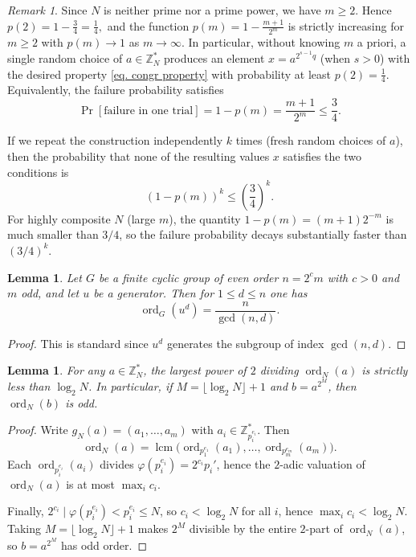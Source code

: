 \documentclass[11pt,reqno]{article}
\numberwithin{equation}{section}
\theoremstyle{plain}
\newtheorem{lemma}[theorem]{Lemma}
\theoremstyle{definition}
\theoremstyle{remark}
\newtheorem{remark}[theorem]{Remark}
\newcommand{\Z}{\mathbb{Z}}
\begin{document}
\begin{remark}\label{rem:nt:amplification}
Since $N$ is neither prime nor a prime power, we have $m\ge 2$.
Hence $p(2)=1-\frac{3}{4}=\frac14,$
and the function $p(m)=1-\frac{m+1}{2^m}$ is strictly increasing for $m\ge 2$ with
$p(m)\to 1$ as $m\to\infty$.
In particular, without knowing $m$ a priori, a single random choice of $a\in\Z_N^\ast$
produces an element $x=a^{2^{s-1}q}$ (when $s>0$) with the desired property \eqref{eq. congr property}
with probability at least $p(2)=\frac14$.
Equivalently, the failure probability satisfies
\[
\Pr[\text{failure in one trial}]=1-p(m)=\frac{m+1}{2^m}\le \frac34.
\]

If we repeat the construction independently $k$ times (fresh random choices of $a$),
then the probability that none of the resulting values $x$ satisfies the two conditions is
\[
(1-p(m))^k \le \left(\frac34\right)^k.
\]
For highly composite $N$ (large $m$), the quantity $1-p(m)=(m+1)2^{-m}$ is much smaller than $3/4$,
so the failure probability decays substantially faster than $(3/4)^k$.
\end{remark}


\medskip
\begin{lemma}\label{lem:nt:cyclic-order}
Let $G$ be a finite cyclic group of even order $n=2^c m$ with $c>0$ and $m$ odd, and let $u$ be a generator.
Then for $1\le d\le n$ one has
\[
\operatorname{ord}_G(u^d)=\frac{n}{\gcd(n,d)}.
\]
\end{lemma}

\begin{proof}
This is standard since $u^d$ generates the subgroup of index $\gcd(n,d)$.
\end{proof}

\medskip
\begin{lemma}\label{lem:nt:oddify}
For any $a\in\mathbb{Z}_N^\ast$, the largest power of $2$ dividing $\operatorname{ord}_N(a)$ is strictly less than $\log_2 N$.
In particular, if $M=\lfloor\log_2 N\rfloor+1$ and $b=a^{2^M}$, then $\operatorname{ord}_N(b)$ is odd.
\end{lemma}

\begin{proof}
Write $g_N(a)=(a_1,\dots,a_m)$ with $a_i\in\mathbb{Z}_{p_i^{e_i}}^\ast$.
Then
\[
\operatorname{ord}_N(a)=\operatorname{lcm}\bigl(\operatorname{ord}_{p_1^{e_1}}(a_1),\dots,\operatorname{ord}_{p_m^{e_m}}(a_m)\bigr).
\]
Each $\operatorname{ord}_{p_i^{e_i}}(a_i)$ divides $\varphi(p_i^{e_i})=2^{c_i}p_i'$, hence the $2$-adic valuation of
$\operatorname{ord}_N(a)$ is at most $\max_i c_i$.

Finally, $2^{c_i}\mid \varphi(p_i^{e_i})<p_i^{e_i}\le N$, so $c_i<\log_2 N$ for all $i$, hence
$\max_i c_i<\log_2 N$.  Taking $M=\lfloor\log_2 N\rfloor+1$ makes $2^M$ divisible by the entire $2$-part of $\operatorname{ord}_N(a)$,
so $b=a^{2^M}$ has odd order.
\end{proof}
\end{document}
